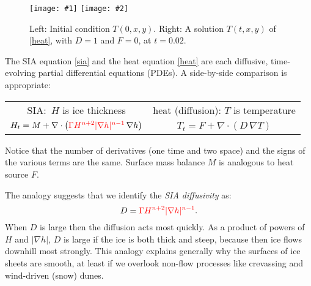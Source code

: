 \documentclass[letterpaper,final,12pt,reqno]{amsart}
\newcommand{\grad}{\nabla}
\newcommand{\Div}{\nabla\cdot}
\newcommand{\twofigsizes}[5]{
\begin{figure}[ht]
\centering
\texttt{[image: \#1]} \quad
\texttt{[image: \#2]}
\caption{#3}
\label{fig:#1}
\end{figure}}
\begin{document}
\twofigsizes{initialheat}{finalheat}{Left: Initial condition $T(0,x,y)$.   Right: A solution $T(t,x,y)$ of  \eqref{heat}, with $D=1$ and $F=0$, at $t=0.02$.}{2.8in}{2.8in}

The SIA equation \eqref{sia} and the heat equation \eqref{heat} are each diffusive, time-evolving partial differential equations (PDEs).  A side-by-side comparison is appropriate:
\begin{center}
\begin{tabular}{cc}
\vspace{1mm}
SIA:\, $H$ is ice thickness & \phantom{foo bar} heat (diffusion): $T$ is temperature\phantom{foo bar}  \\
\vspace{1mm}
	$H_t = M + \Div \left({\color{red}\Gamma H^{n+2} |\grad h|^{n-1}}\, \grad h \right)$  &  $T_t = F + \Div (D\, \grad T)$
\end{tabular}
\end{center}
\vspace{1mm}
Notice that the number of derivatives (one time and two space) and the signs of the various terms are the same.  Surface mass balance $M$ is analogous to heat source $F$.

The analogy suggests that we identify the \emph{SIA diffusivity} as:
\begin{equation}
	D = {\color{red}\Gamma H^{n+2} |\grad h|^{n-1}}.  \label{siadiffusivity}
\end{equation}
When $D$ is large then the diffusion acts most quickly.  As a product of powers of $H$ and $|\grad h|$, $D$ is large if the ice is both thick and steep, because then ice flows downhill most strongly.  This analogy explains generally why the surfaces of ice sheets are smooth, at least if we overlook non-flow processes like crevassing and wind-driven (snow) dunes.
\end{document}
